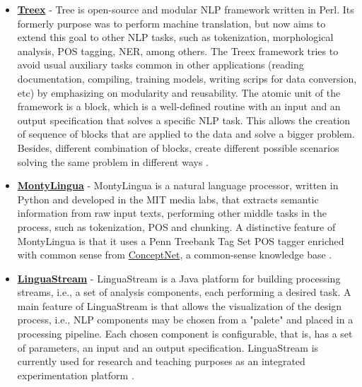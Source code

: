 \begin{itemize}
    \item \textbf{\href{http://ufal.mff.cuni.cz/treex}{Treex}} - Tree is open-source and modular NLP framework written in Perl. Its formerly purpose was to perform machine translation, but now aims to extend this goal to other NLP tasks, such as tokenization, morphological analysis,  POS  tagging, NER, among others. The Treex framework tries to avoid usual auxiliary tasks common in other applications (reading documentation, compiling, training models, writing scrips for data conversion, etc) by emphasizing on modularity and reusability. The atomic unit of the framework is a block, which is a well-defined routine with an input and an output specification that solves a specific NLP task. This allows the creation of sequence of blocks that are applied to the data and solve a bigger problem. Besides, different combination of blocks, create different possible scenarios solving the same problem in different ways \citep{Popel2010TectoMT}.
    \item \textbf{\href{http://alumni.media.mit.edu/~hugo/montylingua}{MontyLingua}} - MontyLingua is a natural language processor, written in Python and developed in the MIT media labs, that extracts semantic information from raw input texts, performing other middle tasks in the process, such as tokenization, POS and chunking. A distinctive feature of MontyLingua is that it uses a Penn Treebank Tag Set POS tagger enriched with common sense from \href{http://conceptnet5.media.mit.edu/}{ConceptNet}, a common-sense knowledge base \citep{Liu2004Montylingua, Ling2006MontyLinguaReview}.
    \item \textbf{\href{http://www.linguastream.org}{LinguaStream}} - LinguaStream is a Java platform for building processing streams, i.e., a set of analysis components, each performing a desired task. A main feature of LinguaStream is that allows the visualization of the design process, i.e., NLP components may be chosen from a "palete" and placed in a processing pipeline. Each chosen component is configurable, that is, has a set of parameters, an input and an output specification. LinguaStream is currently used for research and teaching purposes as an integrated experimentation platform \citep{Bilhaut2006LinguaStream}.
\end{itemize}

